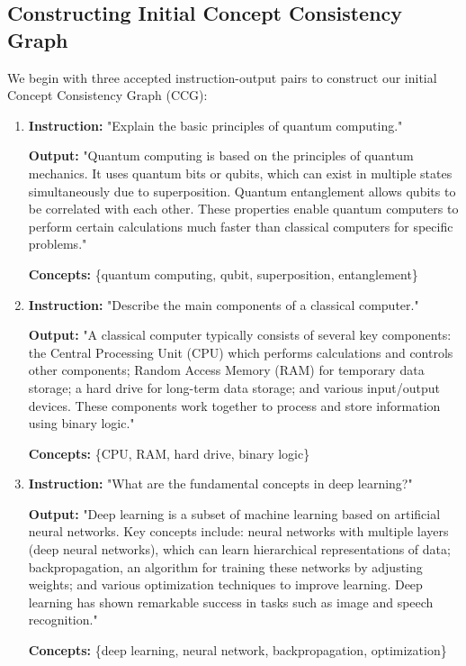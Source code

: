 \subsection{Constructing Initial Concept Consistency Graph}
We begin with three accepted instruction-output pairs to construct our initial Concept Consistency Graph (CCG):
\begin{enumerate}[leftmargin=*]
    \item \textbf{Instruction:} "Explain the basic principles of quantum computing."
    
    \textbf{Output:} "Quantum computing is based on the principles of quantum mechanics. It uses quantum bits or qubits, which can exist in multiple states simultaneously due to superposition. Quantum entanglement allows qubits to be correlated with each other. These properties enable quantum computers to perform certain calculations much faster than classical computers for specific problems."
    
    \textbf{Concepts:} \{quantum computing, qubit, superposition, entanglement\}

    \item \textbf{Instruction:} "Describe the main components of a classical computer."
    
    \textbf{Output:} "A classical computer typically consists of several key components: the Central Processing Unit (CPU) which performs calculations and controls other components; Random Access Memory (RAM) for temporary data storage; a hard drive for long-term data storage; and various input/output devices. These components work together to process and store information using binary logic."
    
    \textbf{Concepts:} \{CPU, RAM, hard drive, binary logic\}

    \item \textbf{Instruction:} "What are the fundamental concepts in deep learning?"
    
    \textbf{Output:} "Deep learning is a subset of machine learning based on artificial neural networks. Key concepts include: neural networks with multiple layers (deep neural networks), which can learn hierarchical representations of data; backpropagation, an algorithm for training these networks by adjusting weights; and various optimization techniques to improve learning. Deep learning has shown remarkable success in tasks such as image and speech recognition."
    
    \textbf{Concepts:} \{deep learning, neural network, backpropagation, optimization\}
\end{enumerate}
